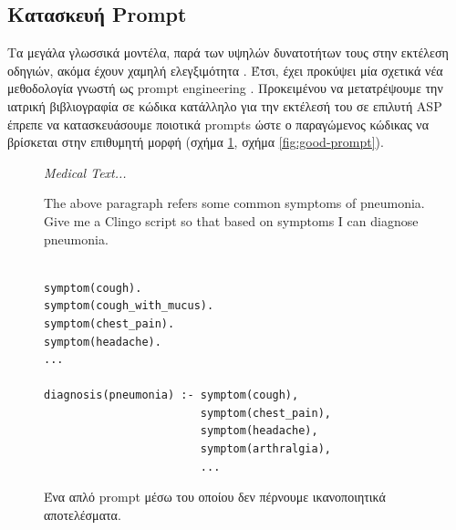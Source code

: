 \documentclass[10pt,leqno]{amsart}
\newenvironment{commandline}{
	\medskip
	\begin{mdframed}[style=commandline]
}{
	\end{mdframed}
	\medskip
}
\newenvironment{prompt}[1][Prompt:]{ %
	\medskip
	\begin{mdframed}[style=warning]
		\noindent{\textbf{#1}}
}{
	\end{mdframed}
}
\begin{document}
\subsection{Κατασκευή Prompt}

Τα μεγάλα γλωσσικά μοντέλα, παρά των υψηλών δυνατοτήτων τους στην εκτέλεση οδηγιών, ακόμα 
έχουν χαμηλή ελεγξιμότητα \cite{bowman2023things}.
Έτσι, έχει προκύψει μία σχετικά νέα μεθοδολογία  γνωστή ως prompt engineering \cite{liu2021pretrain, promptingguidePromptEngineering}.
Προκειμένου να μετατρέψουμε την ιατρική βιβλιογραφία σε κώδικα
κατάλληλο για την εκτέλεσή του σε επιλυτή ASP έπρεπε να κατασκευάσουμε 
ποιοτικά prompts ώστε ο παραγώμενος κώδικας να βρίσκεται στην επιθυμητή μορφή (σχήμα \ref{fig:bad-prompt}, σχήμα \ref{fig:good-prompt}).

\begin{figure}[!h]
\centering
\begin{prompt}
\textit{Medical Text...}

The above paragraph refers some common symptoms of pneumonia.
Give me a Clingo script so that based on symptoms I can diagnose pneumonia.
\end{prompt}


\begin{commandline}
\begin{verbatim}

symptom(cough).
symptom(cough_with_mucus).
symptom(chest_pain).
symptom(headache).
...

diagnosis(pneumonia) :- symptom(cough), 
                        symptom(chest_pain), 
                        symptom(headache), 
                        symptom(arthralgia),
                        ...
\end{verbatim}
\end{commandline}

\caption{Ένα απλό prompt μέσω του οποίου δεν πέρνουμε ικανοποιητικά αποτελέσματα.}
\label{fig:bad-prompt}
\end{figure}
\end{document}
